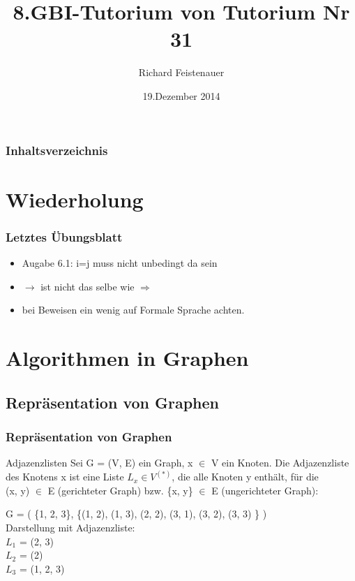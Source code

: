 \documentclass{beamer}
\author{Richard Feistenauer}
\title{8.GBI-Tutorium von Tutorium Nr 31}
\date{19.Dezember 2014}
\begin{document}
\begin {frame}
	\titlepage
\end {frame}

\begin {frame}
	\frametitle {Inhaltsverzeichnis}
	\tableofcontents
\end {frame}

\section{Wiederholung}

\begin{frame}
	\frametitle{Letztes \"Ubungsblatt}
		\begin{itemize}
			\item Augabe 6.1: i=j muss nicht unbedingt da sein
			\item $\rightarrow$ ist nicht das selbe wie $\Rightarrow$
			\item bei Beweisen ein wenig auf Formale Sprache achten.
		\end{itemize}
\end{frame}

\section{Algorithmen in Graphen} 
\subsection{Repr\"asentation von Graphen}

\begin{frame}
	\frametitle{Repr\"asentation von Graphen}

	\begin{block}{Adjazenzlisten}
		Sei G = (V, E) ein Graph, x $\in$ V ein Knoten. Die Adjazenzliste des Knotens x ist eine Liste $L_x \in V^{(*)}$, die alle 				Knoten y enth\"alt, f\"ur die \\ (x, y) $\in$ E (gerichteter Graph) bzw. \{x, y\} $\in$ E (ungerichteter Graph):
	\end{block}

	\begin{example}
		G = ( \{1, 2, 3\}, \{(1, 2), (1, 3), (2, 2), (3, 1), (3, 2), (3, 3) \} ) \\
		\parskip 12pt
		Darstellung mit Adjazenzliste: \\
		$L_1$ = (2, 3) \\
		$L_2$ = (2) \\
		$L_3$ = (1, 2, 3)\\
		
	\end{example}
\end{frame}
\end{document}
